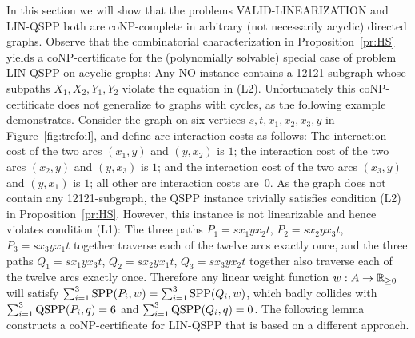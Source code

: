 In this section we will show that the problems VALID-LINEARIZATION and LIN-QSPP
both are coNP-complete in arbitrary (not necessarily acyclic) directed graphs.
Observe that the combinatorial characterization in Proposition~\ref{pr:HS} yields a coNP-certificate 
for the (polynomially solvable) special case of problem LIN-QSPP on acyclic graphs:
Any NO-instance contains a 12121-subgraph whose subpaths $X_1,X_2,Y_1,Y_2$ violate the equation in (L2).
Unfortunately this coNP-certificate does not generalize to graphs with cycles, as the 
following example demonstrates.
Consider the graph on six vertices $s,t,x_1,x_2,x_3,y$ in Figure~\ref{fig:trefoil}, 
and define arc interaction costs as follows:
The interaction cost of the two arcs $(x_1,y)$ and $(y,x_2)$ is $1$; 
the interaction cost of the two arcs $(x_2,y)$ and $(y,x_3)$ is $1$; and
the interaction cost of the two arcs $(x_3,y)$ and $(y,x_1)$ is $1$;
all other arc interaction costs are~$0$.
As the graph does not contain any 12121-subgraph, the QSPP instance trivially satisfies 
condition (L2) in Proposition~\ref{pr:HS}.
However, this instance is not linearizable and hence violates condition (L1):
The three paths 
$P_1=sx_1yx_2t$, 
$P_2=sx_2yx_3t$,
$P_3=sx_3yx_1t$
together traverse each of the twelve arcs exactly once, and the three paths
$Q_1=sx_1yx_3t$,
$Q_2=sx_2yx_1t$,
$Q_3=sx_3yx_2t$
together also traverse each of the twelve arcs exactly once.
Therefore any linear weight function $w:A\to{\mathbb{R}_{\ge0}}$ will satisfy $\sum_{i=1}^3\text{SPP}(P_i,w)=\sum_{i=1}^3\text{SPP}(Q_i,w)$,
which badly collides with $\sum_{i=1}^3\text{QSPP}(P_i,q)=6$ and $\sum_{i=1}^3\text{QSPP}(Q_i,q)=0$.
The following lemma constructs a coNP-certificate for LIN-QSPP that is based on a 
different approach.

